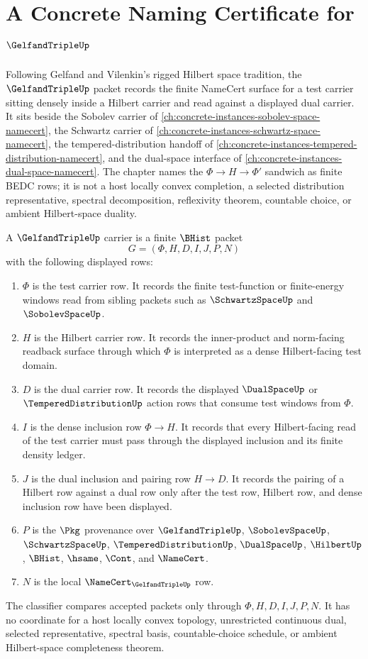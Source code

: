 \chapter{A Concrete Naming Certificate for $\GelfandTripleUp$}
\label{ch:concrete-instances-gelfand-triple-namecert}

Following Gelfand and Vilenkin's rigged Hilbert space tradition, the $\GelfandTripleUp$ packet records the finite NameCert surface for a test carrier sitting densely inside a Hilbert carrier and read against a displayed dual carrier. It sits beside the Sobolev carrier of \autoref{ch:concrete-instances-sobolev-space-namecert}, the Schwartz carrier of \autoref{ch:concrete-instances-schwartz-space-namecert}, the tempered-distribution handoff of \autoref{ch:concrete-instances-tempered-distribution-namecert}, and the dual-space interface of \autoref{ch:concrete-instances-dual-space-namecert}. The chapter names the $\Phi \to H \to \Phi'$ sandwich as finite BEDC rows; it is not a host locally convex completion, a selected distribution representative, spectral decomposition, reflexivity theorem, countable choice, or ambient Hilbert-space duality.

\begin{definition}
\label{def:gelfand-triple-carrier}
A $\GelfandTripleUp$ carrier is a finite $\BHist$ packet
$$
G=(\Phi,H,D,I,J,P,N)
$$
with the following displayed rows:
\begin{enumerate}
\item $\Phi$ is the test carrier row. It records the finite test-function or finite-energy windows read from sibling packets such as $\SchwartzSpaceUp$ and $\SobolevSpaceUp$.
\item $H$ is the Hilbert carrier row. It records the inner-product and norm-facing readback surface through which $\Phi$ is interpreted as a dense Hilbert-facing test domain.
\item $D$ is the dual carrier row. It records the displayed $\DualSpaceUp$ or $\TemperedDistributionUp$ action rows that consume test windows from $\Phi$.
\item $I$ is the dense inclusion row $\Phi \to H$. It records that every Hilbert-facing read of the test carrier must pass through the displayed inclusion and its finite density ledger.
\item $J$ is the dual inclusion and pairing row $H \to D$. It records the pairing of a Hilbert row against a dual row only after the test row, Hilbert row, and dense inclusion row have been displayed.
\item $P$ is the $\Pkg$ provenance over $\GelfandTripleUp$, $\SobolevSpaceUp$, $\SchwartzSpaceUp$, $\TemperedDistributionUp$, $\DualSpaceUp$, $\HilbertUp$, $\BHist$, $\hsame$, $\Cont$, and $\NameCert$.
\item $N$ is the local $\NameCert_{\GelfandTripleUp}$ row.
\end{enumerate}
The classifier compares accepted packets only through $\Phi,H,D,I,J,P,N$. It has no coordinate for a host locally convex topology, unrestricted continuous dual, selected representative, spectral basis, countable-choice schedule, or ambient Hilbert-space completeness theorem.
\end{definition}

